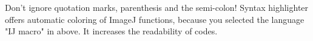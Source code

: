 Don't ignore quotation marks, parenthesis and the semi-colon! 
Syntax highlighter offers automatic coloring of ImageJ functions, because you selected the language "IJ macro" in above. It increases the readability of codes.